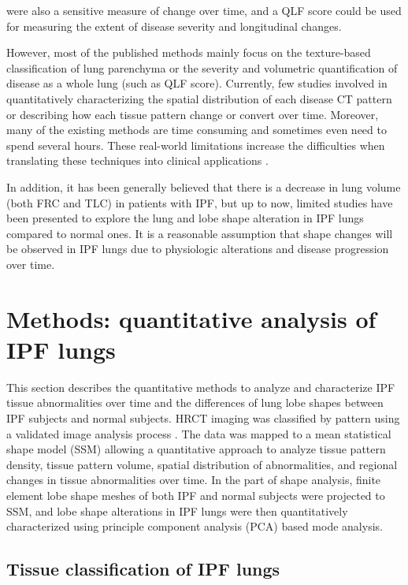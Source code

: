 were also a sensitive measure of change over time, and a QLF score could be used for measuring the extent of disease severity and longitudinal changes.

However, most of the published methods mainly focus on the texture-based classification of lung parenchyma or the severity and volumetric quantification of disease as a whole lung (such as QLF score). Currently, few studies involved in quantitatively characterizing the spatial distribution of each disease CT pattern or describing how each tissue pattern change or convert over time. Moreover, many of the existing methods are time consuming and sometimes even need to spend several hours. These real-world limitations increase the difficulties when translating these techniques into clinical applications \citep{bartholmai2013quantitative}.

In addition, it has been generally believed that there is a decrease in lung volume (both FRC and TLC) in patients with IPF, but up to now, limited studies have been presented to explore the lung and lobe shape alteration in IPF lungs compared to normal ones. It is a reasonable assumption that shape changes will be observed in IPF lungs due to physiologic alterations and disease progression over time. 

\section{Methods: quantitative analysis of IPF lungs}
This section describes the quantitative methods to analyze and characterize IPF tissue abnormalities over time and the differences of lung lobe shapes between IPF subjects and normal subjects. HRCT imaging was classified by pattern using a validated image analysis process \citep{maldonado2013automated,bartholmai2013quantitative,raghunath2014quantitative}. The data was mapped to a mean statistical shape model (SSM) allowing a quantitative approach to analyze tissue pattern density, tissue pattern volume, spatial distribution of abnormalities, and regional changes in tissue abnormalities over time. In the part of shape analysis, finite element lobe shape meshes of both IPF and normal subjects were projected to SSM, and lobe shape alterations in IPF lungs were then quantitatively characterized using principle component analysis (PCA) based mode analysis.

\subsection{Tissue classification of IPF lungs}
